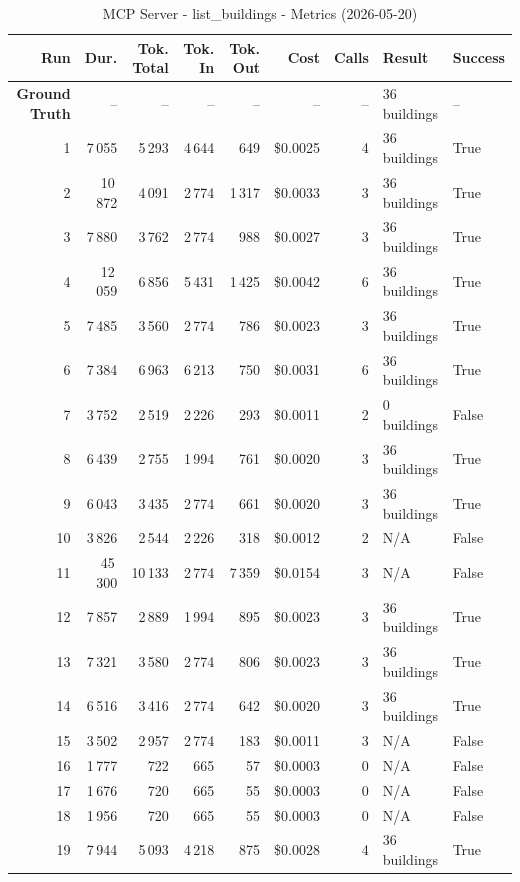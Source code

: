 \documentclass[a4paper,11pt]{article}
\begin{document}
\begin{table}[ht]
\centering
\scriptsize
\caption{MCP Server - list\_buildings - Metrics (2026-05-20)}
\label{tab:mcp\_list\_buildings\_metrics\_2026-05-20}
\begin{tabular}{r r r r r r r p{3cm} l}
\hline
Run & Dur. & Tok. Total & Tok. In & Tok. Out & Cost & Calls & Result & Success \\
\hline
\textbf{Ground Truth} & -- & -- & -- & -- & -- & -- & 36 buildings & -- \\
\hline
1 & 7\,055 & 5\,293 & 4\,644 & 649 & \$0.0025 & 4 & 36 buildings & True \\
2 & 10\,872 & 4\,091 & 2\,774 & 1\,317 & \$0.0033 & 3 & 36 buildings & True \\
3 & 7\,880 & 3\,762 & 2\,774 & 988 & \$0.0027 & 3 & 36 buildings & True \\
4 & 12\,059 & 6\,856 & 5\,431 & 1\,425 & \$0.0042 & 6 & 36 buildings & True \\
5 & 7\,485 & 3\,560 & 2\,774 & 786 & \$0.0023 & 3 & 36 buildings & True \\
6 & 7\,384 & 6\,963 & 6\,213 & 750 & \$0.0031 & 6 & 36 buildings & True \\
7 & 3\,752 & 2\,519 & 2\,226 & 293 & \$0.0011 & 2 & 0 buildings & False \\
8 & 6\,439 & 2\,755 & 1\,994 & 761 & \$0.0020 & 3 & 36 buildings & True \\
9 & 6\,043 & 3\,435 & 2\,774 & 661 & \$0.0020 & 3 & 36 buildings & True \\
10 & 3\,826 & 2\,544 & 2\,226 & 318 & \$0.0012 & 2 & N/A & False \\
11 & 45\,300 & 10\,133 & 2\,774 & 7\,359 & \$0.0154 & 3 & N/A & False \\
12 & 7\,857 & 2\,889 & 1\,994 & 895 & \$0.0023 & 3 & 36 buildings & True \\
13 & 7\,321 & 3\,580 & 2\,774 & 806 & \$0.0023 & 3 & 36 buildings & True \\
14 & 6\,516 & 3\,416 & 2\,774 & 642 & \$0.0020 & 3 & 36 buildings & True \\
15 & 3\,502 & 2\,957 & 2\,774 & 183 & \$0.0011 & 3 & N/A & False \\
16 & 1\,777 & 722 & 665 & 57 & \$0.0003 & 0 & N/A & False \\
17 & 1\,676 & 720 & 665 & 55 & \$0.0003 & 0 & N/A & False \\
18 & 1\,956 & 720 & 665 & 55 & \$0.0003 & 0 & N/A & False \\
19 & 7\,944 & 5\,093 & 4\,218 & 875 & \$0.0028 & 4 & 36 buildings & True \\

\end{tabular}
\end{table}
\end{document}
